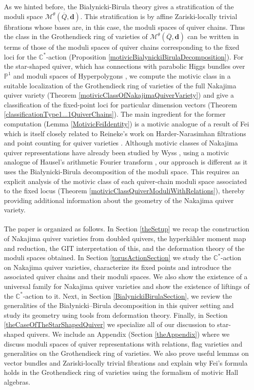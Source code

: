 \documentclass{amsart}
\theoremstyle{plain}
\numberwithin{equation}{section}
\theoremstyle{definition}
\theoremstyle{remark}
\begin{document}
	As we hinted before, the Bia\l ynicki-Birula theory gives a stratification of the moduli space $\mathcal{M}^{\theta}(\overline{Q},\mathbf{d})$. This stratification is by affine Zariski-locally trivial fibrations whose bases are, in this case, the moduli spaces of quiver chains. Thus the class in the Grothendieck ring of varieties of $\mathcal{M}^{\theta}(\overline{Q},\mathbf{d})$ can be written in terms of those of the moduli spaces of quiver chains corresponding to the fixed loci for the $\mathbb{C}^*$-action (Proposition \ref{motivicBialynickiBirulaDecomposition}). For the star-shaped quiver, which has connections with parabolic Higgs bundles over $\mathbb{P}^1$ \cite{FisherRayan} and moduli spaces of Hyperpolygons \cite{GodinhoMandini}, we compute the motivic class in a suitable localization of the Grothendieck ring of varieties of the full Nakajima quiver variety (Theorem \ref{motivicClassOfNakajimaQuiverVariety}) and give a classification of the fixed-point loci for particular dimension vectors (Theorem \ref{classificationType1...1QuiverChains}). The main ingredient for the former computation (Lemma \ref{MotivicFeiIdentity}) is a motivic analogue of a result of Fei \cite{FeiQuiversWithRelations} which is itself closely related to Reineke’s work on Harder-Narasimhan filtrations and point counting for quiver varieties \cite{ReinekePointCounting}. Although motivic classes of Nakajima quiver representations have already been studied by Wyss \cite{WyssMotive}, using a motivic analogue of Hausel's arithmetic Fourier transform \cite{HauselArithmeticFourierTransform}, our approach is different as it uses the Bia\l ynicki-Birula decomposition of the moduli space. This requires an explicit analysis of the motivic class of each quiver-chain moduli space associated to the fixed locus (Theorem \ref{motivicClassQuiverModuliWithRelations}), thereby providing additional information about the geometry of the Nakajima quiver variety.
	\\
	\\
	The paper is organized as follows. In Section \ref{theSetup} we recap the construction of Nakajima quiver varieties from doubled quivers, the hyperkähler moment map and reduction, the GIT interpretation of this, and the deformation theory of the moduli spaces obtained. In Section \ref{torusActionSection} we study the $\mathbb C^*$-action on Nakajima quiver varieties, characterize its fixed points and introduce the associated quiver chains and their moduli spaces. We also show the existence of a universal family for Nakajima quiver varieties and show the existence of liftings of the $\mathbb{C}^*$-action to it. Next, in Section \ref{BialynickiBirulaSection}, we review the generalities of the Bia\l ynicki--Birula decomposition in this quiver setting and study its geometry using tools from deformation theory. Finally, in Section \ref{theCaseOfTheStarShapedQuiver} we specialize all of our discussion to star-shaped quivers. We include an Appendix (Section \ref{theAppendix}) where we discuss moduli spaces of quiver representations with relations, flag varieties and generalities on the Grothendieck ring of varieties. We also prove useful lemmas on vector bundles and Zariski-locally trivial fibrations and explain why Fei's formula holds in the Grothendieck ring of varieties using the formalism of motivic Hall algebras. 
\end{document}
